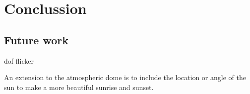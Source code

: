 
\chapter{Conclussion}



\section{Future work}
dof flicker


An extension to the atmospheric dome is to include the location or
angle of the sun to make a more beautiful sunrise and sunset.
